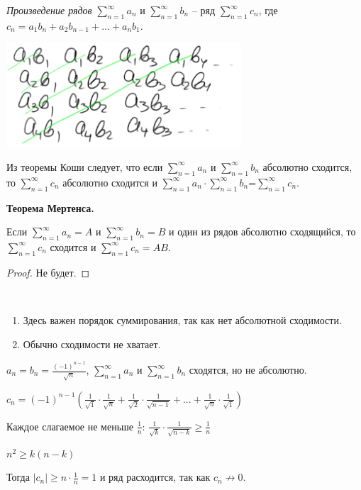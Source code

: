 \begin{definition}
    \textit{Произведение рядов} $\sum\limits_{n=1}^\infty a_n$ и $\sum\limits_{n=1}^\infty b_n$ – ряд $\sum\limits_{n=1}^\infty c_n$, где $c_n=a_1b_n+a_2b_{n-1}+...+a_nb_1$.

    \includegraphics[width=0.35\linewidth]{images/12-04-3.png}
\end{definition}

\begin{remark}
    Из теоремы Коши следует, что если $\sum\limits_{n=1}^\infty a_n$ и $\sum\limits_{n=1}^\infty b_n$ абсолютно сходится, то $\sum\limits_{n=1}^\infty c_n$ абсолютно сходится и $\sum\limits_{n=1}^\infty a_n\cdot \sum\limits_{n=1}^\infty b_n$=$\sum\limits_{n=1}^\infty c_n$.
\end{remark}

\begin{theorem}
    \textbf{Теорема Мертенса.}

    Если $\sum\limits_{n=1}^\infty a_n=A$ и $\sum\limits_{n=1}^\infty b_n=B$ и один из рядов абсолютно сходящийся, то $\sum\limits_{n=1}^\infty c_n$ сходится и $\sum\limits_{n=1}^\infty c_n=AB$.
\end{theorem}

\begin{proof}
    Не будет.
\end{proof}

\begin{remark}~
    \begin{enumerate}
        \item Здесь важен порядок суммирования, так как нет абсолютной сходимости.
        \item Обычно сходимости не хватает.
    \end{enumerate}
\end{remark}

\begin{example}
    $a_n=b_n=\frac{(-1)^{n-1}}{\sqrt{n}}$, $\sum\limits_{n=1}^\infty a_n$ и $\sum\limits_{n=1}^\infty b_n$ сходятся, но не абсолютно.

    $c_n=(-1)^{n-1}(\frac{1}{\sqrt{1}}\cdot \frac{1}{\sqrt{n}}+\frac{1}{\sqrt{2}}\cdot \frac{1}{\sqrt{n-1}}+...+\frac{1}{\sqrt{n}}\cdot \frac{1}{\sqrt{1}})$

    Каждое слагаемое не меньше $\frac{1}{n}$: $\frac{1}{\sqrt{k}}\cdot \frac{1}{\sqrt{n-k}}\geq \frac{1}{n}$

    $n^2\geq k(n-k)$

    Тогда $|c_n|\geq n\cdot \frac{1}{n}=1$ и ряд расходится, так как $c_n\not \rightarrow 0$.
\end{example}

